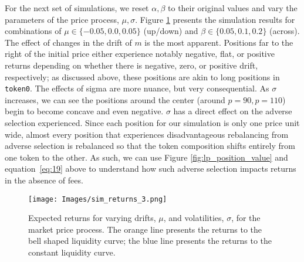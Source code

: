 \documentclass[11pt]{article}
\begin{document}
For the next set of simulations, we reset $\alpha, \beta$ to their original values and vary the parameters of the price process, $\mu, \sigma$. Figure \ref{fig:sim_returns_3} presents the simulation results for combinations of $\mu \in \{ -0.05, 0.0, 0.05 \}$ (up/down) and $\beta \in \{ 0.05, 0.1, 0.2 \}$ (across). The effect of changes in the drift of $m$ is the most apparent. Positions far to the right of the initial price either experience notably negative, flat, or positive returns depending on whether there is negative, zero, or positive drift, respectively; as discussed above, these positions are akin to long positions in \texttt{token0}. The effects of sigma are more nuance, but very consequential. As $\sigma$ increases, we can see the positions around the center (around $p=90, p=110$) begin to become concave and even negative. $\sigma$ has a direct effect on the adverse selection experienced. Since each position for our simulation is only one price unit wide, almost every position that experiences disadvantageous rebalancing from adverse selection is rebalanced so that the token composition shifts entirely from one token to the other. As such, we can use Figure \ref{fig:lp_position_value} and equation~\eqref{eq:19} above to understand how such adverse selection impacts returns in the absence of fees.

\begin{figure}[H]
    \centering
    \texttt{[image: Images/sim\_returns\_3.png]}
    \caption{Expected returns for varying drifts, $\mu$, and volatilities, $\sigma$, for the market price process. The orange line presents the returns to the bell shaped liquidity curve; the blue line presents the returns to the constant liquidity curve.}
    \label{fig:sim_returns_3}
\end{figure}
\end{document}
